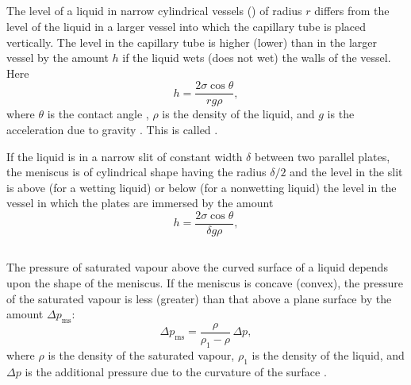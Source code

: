 \subsection{}\label{13.5.5} The level of a liquid in narrow cylindrical vessels () of radius $r$ differs from the level of the liquid in a larger vessel into which the capillary tube is placed vertically. The level in the capillary tube is higher (lower) than in the larger vessel by the amount $h$ if the liquid wets (does not wet) the walls of the vessel. Here
\begin{equation*}%
h = \frac{2 \sigma \cos \theta}{r g \rho},
\end{equation*}
where $\theta$ is the contact angle , $\rho$ is the density of the liquid, and $g$ is the acceleration due to gravity . This is called .

If the liquid is in a narrow slit of constant width $\delta$ between two parallel plates, the meniscus is of cylindrical shape having the radius $\delta/2$ and the level in the slit is above (for a wetting liquid) or below (for a nonwetting liquid) the level in the vessel in which the plates are immersed by the amount
\begin{equation*}%
h = \frac{2 \sigma \cos \theta}{\delta g \rho},
\end{equation*}

\subsection{}\label{13.5.6} The pressure of saturated vapour  above the curved surface of a liquid depends upon the shape of the meniscus. If the meniscus is concave (convex), the pressure of the saturated vapour is less (greater) than that above a plane surface by the amount $\Delta p_{\text{ms}}$:
\begin{equation*}%
\Delta p_{\text{ms}} = \frac{\rho}{\rho_{1} - \rho} \, \Delta p,
\end{equation*}
where $\rho$ is the density of the saturated vapour, $\rho_{1}$ is the density of the liquid, and $\Delta p$ is the additional pressure due to the curvature of the surface .

